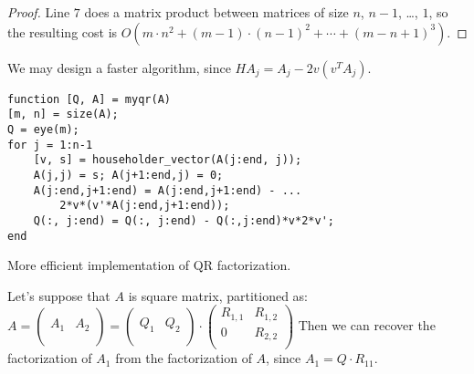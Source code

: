 \documentclass[computationalMathematics.tex]{subfiles}
\begin{document}
\begin{proof}
  Line $7$ does a matrix product between matrices of size $n$, $n-1$, \ldots, $1$, so the resulting cost is  $O(m \cdot n^{2} + {(m-1) \cdot (n-1)}^{2} + \cdots + {(m - n + 1)}^{3})$.

\end{proof}

We may design a faster algorithm, since $HA_j = A_j - 2v(v^T A_j)$.
\begin{center}
\begin{minipage}{.9\linewidth}
\begin{algorithm}[H]
\begin{verbatim}
function [Q, A] = myqr(A)
[m, n] = size(A);
Q = eye(m);
for j = 1:n-1
    [v, s] = householder_vector(A(j:end, j));
    A(j,j) = s; A(j+1:end,j) = 0;
    A(j:end,j+1:end) = A(j:end,j+1:end) - ...
        2*v*(v'*A(j:end,j+1:end));
    Q(:, j:end) = Q(:, j:end) - Q(:,j:end)*v*2*v';
end
\end{verbatim}
  \label{alg:26ottQR2}
\caption{More efficient implementation of QR factorization.}
\end{algorithm}
\end{minipage}
\end{center}

Let's suppose that $A$ is square matrix, partitioned as: 
$A = \begin{pmatrix}
  &\\
  A_{1} & A_{2}\\
  &\\
\end{pmatrix} =
 \begin{pmatrix}
   &\\
   Q_{1} & Q_{2}\\
   &\\
\end{pmatrix} \cdot
\begin{pmatrix}
  R_{1, 1} & R_{1,2}\\
  0 & R_{2,2}\\
\end{pmatrix}$
Then we can recover the factorization of $A_{1}$ from the factorization of $A$, since $A_{1} = Q \cdot R_{11}$.
\end{document}
